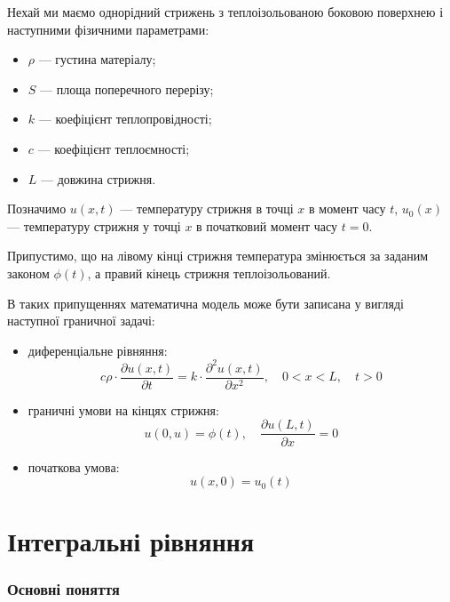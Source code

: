 \begin{example}
	Нехай ми маємо однорідний стрижень з теплоізольованою боковою поверхнею і наступними фізичними параметрами:
	\begin{itemize}
		\item $\rho$ --- густина матеріалу;
		\item $S$ --- площа поперечного перерізу;
		\item $k$ --- коефіцієнт теплопровідності;
		\item $c$ --- коефіцієнт теплоємності;
		\item $L$ --- довжина стрижня.
	\end{itemize}

	Позначимо $u(x, t)$ --- температуру стрижня в точці $x$ в момент часу $t$, $u_0(x)$ --- температуру стрижня у точці $x$ в початковий момент часу $t = 0$. \medskip

	Припустимо, що на лівому кінці стрижня температура змінюється за заданим законом $\phi(t)$, а правий кінець стрижня теплоізольований.
\end{example}

В таких припущеннях математична модель може бути записана у вигляді наступної граничної задачі:

\begin{itemize}
	\item диференціальне рівняння:
	\begin{equation}
		c \rho \cdot \dfrac{\partial u(x, t)}{\partial t} = k \cdot \dfrac{\partial^2 u(x, t)}{\partial x^2}, \quad 0 < x < L, \quad t > 0
	\end{equation}
	\item граничні умови на кінцях стрижня:
	\begin{equation}
		u(0, u) = \phi(t), \quad  \dfrac{\partial u(L, t)}{\partial x} = 0
	\end{equation}
	\item початкова умова:
	\begin{equation}
		u(x, 0) = u_0(t)
	\end{equation}
\end{itemize}

\newpage

\section{Інтегральні рівняння}

\subsubsection{Основні поняття}

